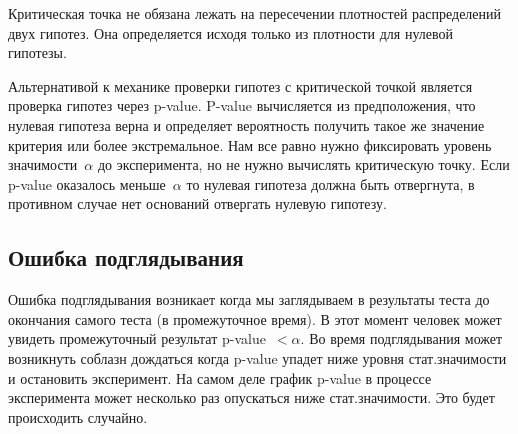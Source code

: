 \documentclass[../handbook.tex]{subfiles}
\begin{document}
Критическая точка не обязана лежать на пересечении плотностей распределений
двух гипотез. Она определяется исходя только из плотности для нулевой гипотезы.

Альтернативой к механике проверки гипотез с критической точкой является
проверка гипотез через p-value. P-value вычисляется из предположения, что
нулевая гипотеза верна и определяет вероятность получить такое же значение
критерия или более экстремальное. Нам все равно нужно фиксировать уровень
значимости~$\alpha$ до эксперимента, но не нужно вычислять критическую точку.
Если p-value оказалось меньше~$\alpha$ то нулевая гипотеза должна быть
отвергнута, в противном случае нет оснований отвергать нулевую гипотезу.

\subsection{Ошибка подглядывания}
Ошибка подглядывания возникает когда мы заглядываем в результаты теста до
окончания самого теста (в промежуточное время). В этот момент человек может
увидеть промежуточный результат p-value~$< \alpha$. Во время подглядывания
может возникнуть соблазн дождаться когда p-value упадет ниже уровня
стат.значимости и остановить эксперимент. На самом деле график p-value в
процессе эксперимента может несколько раз опускаться ниже стат.значимости. Это
будет происходить случайно.

\end{document}
